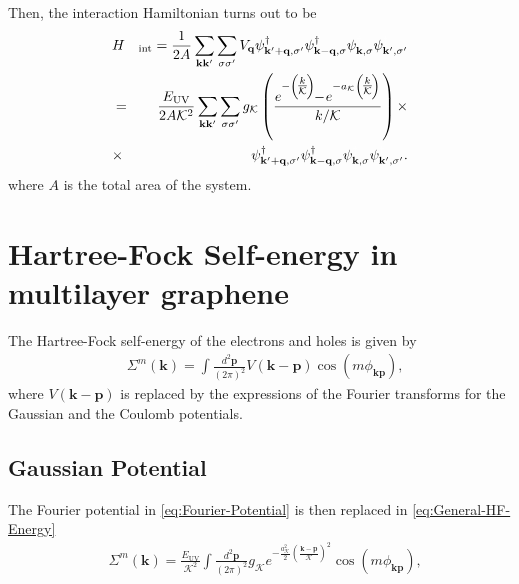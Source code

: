 \documentclass[english,aps,prd,nofootinbib,twocolumn]{revtex4-1}
\begin{document}
Then, the interaction Hamiltonian turns out to be
\begin{eqnarray}
&H&\!_{\mathrm{int}} =
\frac{1}{2A}
\sum_{\mathbf{k }\mathbf{k'}}
\sum_{\sigma \sigma'} 
V_{\mathbf{q}}
\psi_{\mathbf{k'+q,\sigma'}}^{\textcolor{black}{\dagger}}
\psi_{\mathbf{k -q,\sigma }}^{\textcolor{black}{\dagger}}
\psi_{\mathbf{k   ,\sigma }}^{\textcolor{white}{\dagger}}
\psi_{\mathbf{k'  ,\sigma'}}^{\textcolor{white}{\dagger}} \nonumber \\
 &=&  \frac{E_{\mathrm{UV}}}{2A\mathcal{K}^{2}}
\sum_{\mathbf{k }\mathbf{k'}}
\sum_{\sigma \sigma'} 
g_{\mathcal{K}} \left( 
\frac{ 
e^{-\left(\!\tfrac{k}{\mathcal{K}}\!\right) }
\!\!-\!
e^{-a_{\mathcal{K}} 
\left(\!\tfrac{k}{\mathcal{K}}\!\right) } 
}{k/\mathcal{K}}
\right) \times \\
 &\times& \nonumber 
\psi_{\mathbf{k'+q,\sigma'}}^{\textcolor{black}{\dagger}}
\psi_{\mathbf{k -q,\sigma }}^{\textcolor{black}{\dagger}}
\psi_{\mathbf{k   ,\sigma }}^{\textcolor{white}{\dagger}}
\psi_{\mathbf{k'  ,\sigma'}}^{\textcolor{white}{\dagger}}.
\end{eqnarray}
where $A$ is the total area of the system.

\section{Hartree-Fock Self-energy in multilayer graphene}
\label{sect:Self-Energy}

The Hartree-Fock self-energy of the electrons and holes is given by
\begin{equation}
\label{eq:General-HF-Energy}
\begin{split}
&\Sigma^{m}(\mathbf{k }) = 
\int \!\! \frac{d^2 \mathbf{p}}{(2\pi)^2}
V(\mathbf{ k-p })\cos(m\phi_{\mathbf{ k p}}),
\end{split}
\end{equation}
where $V(\mathbf{ k-p })$ is replaced by the expressions of the Fourier transforms for the Gaussian and the Coulomb potentials.

\subsection{Gaussian Potential}
\label{sect:Self-Energy-Gaussian}
The Fourier potential in \eqref{eq:Fourier-Potential} is then replaced in \eqref{eq:General-HF-Energy}
\begin{equation}
\begin{split}
&\Sigma^{m}(\mathbf{k }) = 
\frac{E_{\mathrm{UV}}}{\mathcal{K}^{2}}
\!\!
\int \!\! \frac{d^2 \mathbf{p}}{(2\pi)^2}
g_{\mathcal{K}}
e^{-\tfrac{a_{\mathcal{K}}^{2}}{2}\left( \tfrac{\mathbf{ k-p }}{\mathcal{K}} \right)^{2}} 
\!\!
\cos(m\phi_{\mathbf{ k p}}),
\end{split}
\end{equation}
\end{document}

